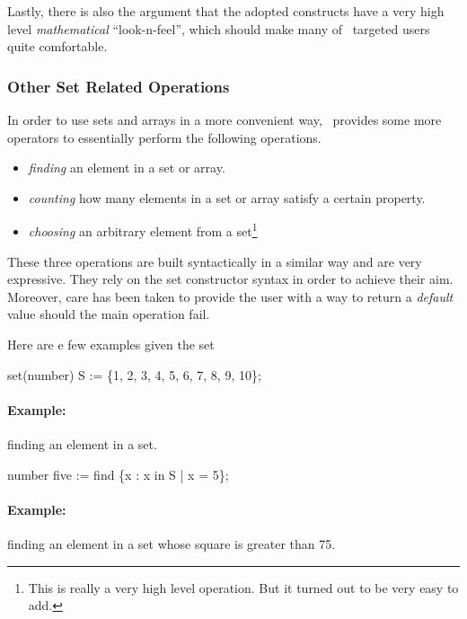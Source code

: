 Lastly, there is also the argument that the adopted constructs have a
very high level {\em mathematical\/} ``look-n-feel'', which should
make many of \Shift\ targeted users quite comfortable.


\subsubsection{Other Set Related Operations}

In order to use sets and arrays in a more convenient way, \Shift\
provides some more operators to essentially perform the following
operations.
\begin{itemize}
\item	{\em finding\/} an element in a set or array.
\item	{\em counting\/} how many elements in a set or array satisfy a
	certain property.
\item	{\em choosing} an arbitrary element from a set\footnote{This
	is really a very high level operation. But it turned out to be
	very easy to add.}
\end{itemize}
These three operations are built syntactically in a similar way and
are very expressive.  They rely on the set constructor syntax in
order to achieve their aim.  Moreover, care has been taken to provide
the user with a way to return a {\em default\/} value should the main
operation fail.

Here are e few examples given the set

\vspace{2mm}

{\tok set(number) S := \{1, 2, 3, 4, 5, 6, 7, 8, 9, 10\};}

\vspace{2mm}

\paragraph{Example:} finding an element in a set.

\vspace{2mm}

{\tok number five := find \{x : x in S | x = 5\};}

\vspace{2mm}


\paragraph{Example:} finding an element in a set whose square is
greater than 75.

